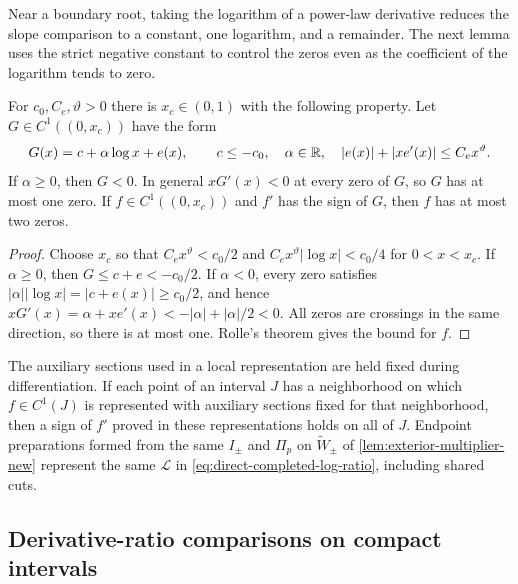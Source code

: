 Near a boundary root, taking the logarithm of a power-law derivative
reduces the slope comparison to a constant, one logarithm, and a
remainder. The next lemma uses the strict negative constant to control
the zeros even as the coefficient of the logarithm tends to zero.

\begin{samepage}
\begin{lemma}
\label{lem:one-logarithm-zero-count}
For \(c_0,C_e,\vartheta>0\) there is \(x_c\in(0,1)\) with the following
property. Let \(G\in C^1((0,x_c))\) have the form
\[
 G(x)=c+\alpha\log x+e(x),\qquad c\le-c_0,\quad \alpha\in\mathbb R,\quad
 |e(x)|+|xe'(x)|\le C_e x^\vartheta .
\]
If \(\alpha\ge0\), then \(G<0\). In general \(xG'(x)<0\) at every zero of
\(G\), so \(G\) has at most one zero. If \(f\in C^1((0,x_c))\)
and \(f'\) has the sign of \(G\), then \(f\) has at most
two zeros.
\end{lemma}
\end{samepage}

\begin{proof}
Choose \(x_c\) so that \(C_e x^\vartheta<c_0/2\) and
\(C_e x^\vartheta|\log x|<c_0/4\) for \(0<x<x_c\). If \(\alpha\ge0\), then
\(G\le c+e<-c_0/2\). If \(\alpha<0\), every zero satisfies
\(|\alpha||\log x|=|c+e(x)|\ge c_0/2\), and hence
\(xG'(x)=\alpha+xe'(x)<-|\alpha|+|\alpha|/2<0\). All zeros are crossings
in the same direction, so there is at most one. Rolle's theorem gives the
bound for \(f\).
\end{proof}

\begin{remark}
\label{lem:direct-frozen-section-sign}
The auxiliary sections used in a local representation are held fixed
during differentiation. If each point of an interval \(J\) has a
neighborhood on which \(f\in C^1(J)\) is represented with auxiliary
sections fixed for that neighborhood, then a sign of \(f'\) proved in
these representations holds on all of \(J\).
Endpoint preparations formed from the same \(I_\pm\) and \(\Pi_p\) on
\(\widetilde W_\pm\) of \cref{lem:exterior-multiplier-new} represent the
same \(\mathcal L\) in \eqref{eq:direct-completed-log-ratio}, including
shared cuts.
\end{remark}

\subsection{Derivative-ratio comparisons on compact intervals}

